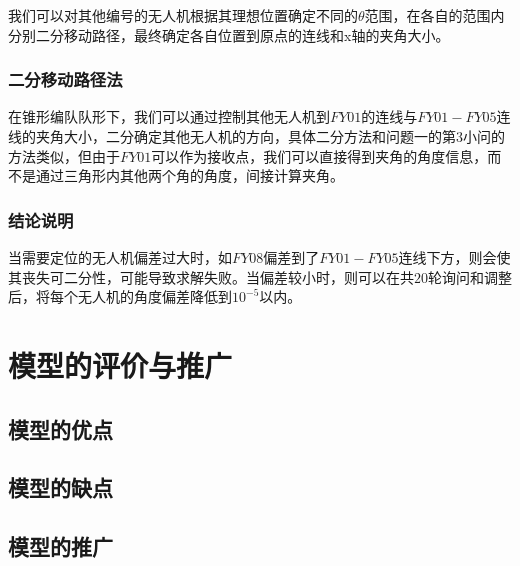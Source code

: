 \documentclass{ctexart}
\begin{document}
    我们可以对其他编号的无人机根据其理想位置确定不同的$\theta$范围，在各自的范围内分别二分移动路径，最终确定各自位置到原点的连线和x轴的夹角大小。

  \subsubsection{二分移动路径法}
    在锥形编队队形下，我们可以通过控制其他无人机到$FY01$的连线与$FY01-FY05$连线的夹角大小，二分确定其他无人机的方向，具体二分方法和问题一的第3小问的方法类似，但由于$FY01$可以作为接收点，我们可以直接得到夹角的角度信息，而不是通过三角形内其他两个角的角度，间接计算夹角。
  \subsubsection{结论说明}
    当需要定位的无人机偏差过大时，如$FY08$偏差到了$FY01-FY05$连线下方，则会使其丧失可二分性，可能导致求解失败。当偏差较小时，则可以在共$20$轮询问和调整后，将每个无人机的角度偏差降低到$10^{-5}$以内。

\section{模型的评价与推广}
\subsection{模型的优点}
\subsection{模型的缺点}
\subsection{模型的推广}
    
\end{document}
